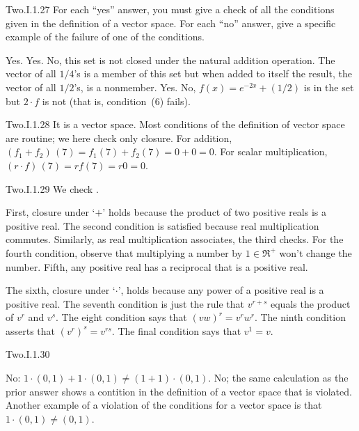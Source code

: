 \begin{ans}{Two.I.1.27}
      For each ``yes'' answer, you must give a check of all the
      conditions given in the
      definition of a vector space.
      For each ``no'' answer, give a specific example of the failure
      of one of the
      conditions.
      \begin{exparts}
        \partsitem Yes.
        \partsitem Yes.
        \partsitem No, this set is not closed under the natural addition
          operation.
          The vector of all $1/4$'s is a member of this set
          but when added to itself the result, the
          vector of all $1/2$'s, is a nonmember.
        \partsitem Yes.
        \partsitem No, \( f(x)=e^{-2x}+(1/2) \) is in the set but
           \( 2\cdot f \) is not (that is, condition~(6) fails).
      \end{exparts}
    
\end{ans}
\begin{ans}{Two.I.1.28}
      It is a vector space.
      Most conditions of the definition of vector space are routine; we here
      check only closure.
      For addition,
      \( (f_1+f_2)\,(7)=f_1(7)+f_2(7)=0+0=0 \).
      For scalar multiplication,
      \( (r\cdot f)\,(7)=rf(7)=r0=0 \).
    
\end{ans}
\begin{ans}{Two.I.1.29}
      We check .

      First, closure under `\( + \)'
      holds because the product of two positive reals is
      a positive real.
      The second condition is satisfied because real multiplication commutes.
      Similarly, as real multiplication associates, the third checks.
      For the fourth condition, observe that multiplying a number by
      \( 1\in\Re^+ \) won't change the number.
      Fifth, any positive real has a reciprocal that is a positive real.

      The sixth, closure under `\( \cdot \)',
      holds because any power of a positive real is a
      positive real.
      The seventh condition is just the rule that \( v^{r+s} \) equals
      the product of \( v^r \) and \( v^s \).
      The eight condition says that \( (vw)^r=v^rw^r \).
      The ninth condition asserts that \( (v^r)^s=v^{rs} \).
      The final condition says that \( v^1=v \).
    
\end{ans}
\begin{ans}{Two.I.1.30}
        \begin{exparts}
           \partsitem No: \( 1\cdot(0,1)+1\cdot(0,1)\neq (1+1)\cdot(0,1) \).
           \partsitem No; the same calculation as the prior answer shows
              a contition in the definition of a vector space that is
              violated.
              Another example of a violation of the conditions for a
              vector space is that \( 1\cdot (0,1)\neq (0,1) \).
        \end{exparts}
      
\end{ans}
